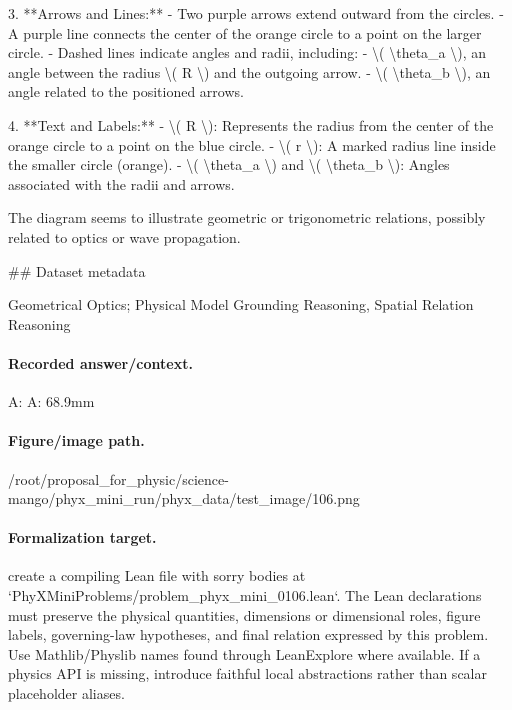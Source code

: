 3. **Arrows and Lines:**
   - Two purple arrows extend outward from the circles.
   - A purple line connects the center of the orange circle to a point on the larger circle.
   - Dashed lines indicate angles and radii, including:
     - \textbackslash{}( \textbackslash{}theta\_a \textbackslash{}), an angle between the radius \textbackslash{}( R \textbackslash{}) and the outgoing arrow.
     - \textbackslash{}( \textbackslash{}theta\_b \textbackslash{}), an angle related to the positioned arrows.

4. **Text and Labels:**
   - \textbackslash{}( R \textbackslash{}): Represents the radius from the center of the orange circle to a point on the blue circle.
   - \textbackslash{}( r \textbackslash{}): A marked radius line inside the smaller circle (orange).
   - \textbackslash{}( \textbackslash{}theta\_a \textbackslash{}) and \textbackslash{}( \textbackslash{}theta\_b \textbackslash{}): Angles associated with the radii and arrows.

The diagram seems to illustrate geometric or trigonometric relations, possibly related to optics or wave propagation.

\#\# Dataset metadata

Geometrical Optics; Physical Model Grounding Reasoning, Spatial Relation Reasoning

\paragraph{Recorded answer/context.}
A: A: 68.9mm

\paragraph{Figure/image path.}
/root/proposal\_for\_physic/science-mango/phyx\_mini\_run/phyx\_data/test\_image/106.png

\paragraph{Formalization target.}
create a compiling Lean file with sorry bodies at `PhyXMiniProblems/problem\_phyx\_mini\_0106.lean`. The Lean declarations must preserve the physical quantities, dimensions or dimensional roles, figure labels, governing-law hypotheses, and final relation expressed by this problem.
Use Mathlib/Physlib names found through LeanExplore where available. If a physics API is missing, introduce faithful local abstractions rather than scalar placeholder aliases.

